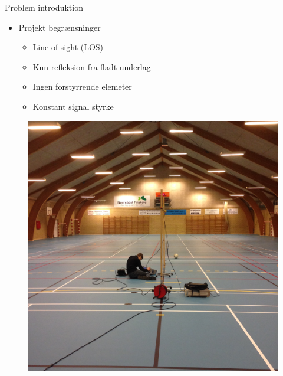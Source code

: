 \begin{frame}{Problem introduktion}
\begin{minipage}{0.5\textwidth}

\begin{itemize}
\item Projekt begrænsninger
\begin{itemize}
\item Line of sight (LOS)
\item Kun refleksion fra fladt underlag
\item Ingen forstyrrende elemeter
\item Konstant signal styrke
\end{itemize}
\end{itemize}

\end{minipage}
\begin{minipage}{0.45\textwidth}

\begin{figure}[!htbp]
 \centering
  \includegraphics[width = \columnwidth, angle = -90]{figures/Hal.jpg}
  \end{figure}

\end{minipage}
\end{frame} 
 
